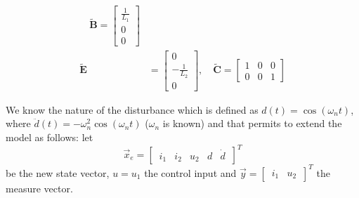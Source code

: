 \documentclass[12pt,a4paper,oneside]{book}
\begin{document}
\begin{onehalfspace}
\begin{mybox}
\begin{equation*}
\begin{aligned}
			\quad 
			\tilde{\mathbf{B}} = \begin{bmatrix}
				\frac{1}{L_1} \\[6pt]
				0 \\[6pt]
				0
			\end{bmatrix} \\[6pt]
			\tilde{\mathbf{E}} &= \begin{bmatrix}
				0 \\[6pt]
				-\frac{1}{L_2} \\[6pt]
				0
			\end{bmatrix}, \quad \tilde{\mathbf{C}} = 
			\begin{bmatrix}
				1 & 0 & 0 \\[6pt]
				0 & 0 & 1
			\end{bmatrix}
		\end{aligned}
	\end{equation*}
	
\end{mybox}
We know the nature of the disturbance which is defined as $d(t) = \cos(\omega_n 
t)$, where $\ddot{d}(t) = -\omega_n^2\cos(\omega_n t)$ ($\omega_n$ is known) 
and that permits to extend the model as follows: let 
$$\vec{x}_{e}=\begin{bmatrix}\, i_1 & i_2 & u_2 & d & \dot{d}\,\end{bmatrix}^T$$ 
be the new state vector, $u=u_1$ the control input and 
$\vec{y}=\begin{bmatrix}\,i_1 & u_2\,\end{bmatrix}^T$ the measure vector.\\


\end{onehalfspace}
\end{document}
